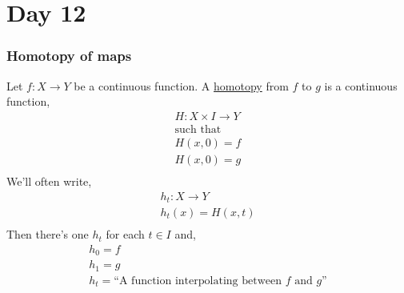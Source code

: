\section{Day 12}
    \subsubsection{Homotopy of maps}
            \begin{definition}
            Let $f: X\rightarrow Y$ be a continuous function.
            A \underline{homotopy} from $f$ to $g$ is a continuous function,
            \begin{align*}
                H:X\times I \rightarrow Y\\
                \text{such that}\\
                H(x,0)=f\\
                H(x,0)=g\\
            \end{align*}
            We'll often write,
            \begin{align*}
                h_t:X \rightarrow Y\\
                h_t(x)=H(x,t)\\
            \end{align*}
            Then there's one $h_t$ for each $t\in I$ and,
            \begin{align*}
                h_0=f\\
                h_1=g\\
                h_t=\text{``A function interpolating between $f$ and $g$''}\\
            \end{align*}
            \end{definition}
